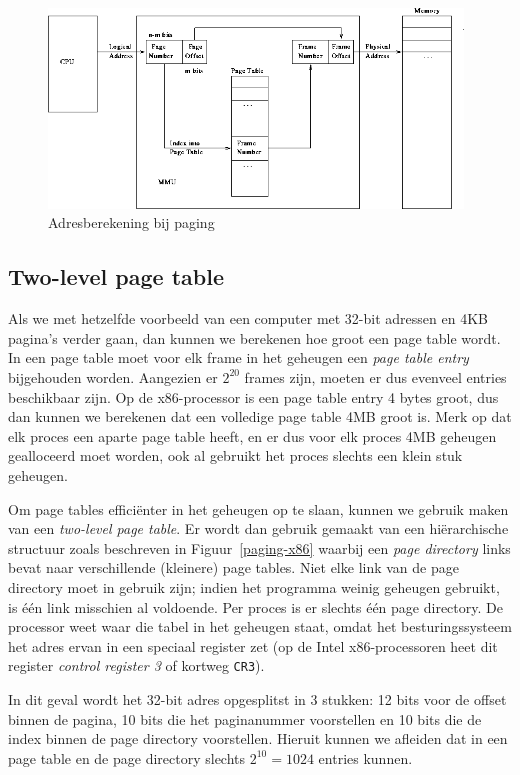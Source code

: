 \begin{figure}
\begin{center}
\includegraphics[width=110mm]{images/paging_hardware.png}
\end{center}
\caption{Adresberekening bij paging}
\label{paging}
\end{figure}

\subsection{Two-level page table}

Als we met hetzelfde voorbeeld van een computer met 32-bit adressen en 4KB pagina's verder gaan, dan kunnen we berekenen hoe groot een page table wordt. In een page table moet voor elk frame in het geheugen een \emph{page table entry} bijgehouden worden. Aangezien er $2^{20}$ frames zijn, moeten er dus evenveel entries beschikbaar zijn. Op de x86-processor is een page table entry 4 bytes groot, dus dan kunnen we berekenen dat een volledige page table 4MB groot is. Merk op dat elk proces een aparte page table heeft, en er dus voor elk proces 4MB geheugen gealloceerd moet worden, ook al gebruikt het proces slechts een klein stuk geheugen.

Om page tables effici\"enter in het geheugen op te slaan, kunnen we gebruik maken van een \emph{two-level page table}. Er wordt dan gebruik gemaakt van een hi\"erarchische structuur zoals beschreven in Figuur~\ref{paging-x86} waarbij een \emph{page directory} links bevat naar verschillende (kleinere) page tables. Niet elke link van de page directory moet in gebruik zijn; indien het programma weinig geheugen gebruikt, is \'e\'en link misschien al voldoende. Per proces is er slechts \'e\'en page directory. De processor weet waar die tabel in het geheugen staat, omdat het besturingssysteem het adres ervan in een speciaal register zet (op de Intel x86-processoren heet dit register \emph{control register 3} of kortweg \texttt{CR3}).

In dit geval wordt het 32-bit adres opgesplitst in 3 stukken: 12 bits voor de offset binnen de pagina, 10 bits die het paginanummer voorstellen en 10 bits die de index binnen de page directory voorstellen. Hieruit kunnen we afleiden dat in een page table en de page directory slechts $2^{10} = 1024$ entries kunnen. 

